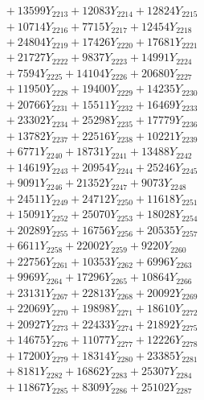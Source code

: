 \documentclass[a4paper,10pt]{article}
\begin{document}
{\begin{align}
&\;  + 13599 Y_{2213} + 12083 Y_{2214} + 12824 Y_{2215} \\[0.3ex]
&\;  + 10714 Y_{2216} + 7715 Y_{2217} + 12454 Y_{2218} \\[0.5ex]\allowbreak
&\;  + 24804 Y_{2219} + 17426 Y_{2220} + 17681 Y_{2221} \\[0.3ex]
&\;  + 21727 Y_{2222} + 9837 Y_{2223} + 14991 Y_{2224} \\[0.3ex]
&\;  + 7594 Y_{2225} + 14104 Y_{2226} + 20680 Y_{2227} \\[0.3ex]
&\;  + 11950 Y_{2228} + 19400 Y_{2229} + 14235 Y_{2230} \\[0.3ex]
&\;  + 20766 Y_{2231} + 15511 Y_{2232} + 16469 Y_{2233} \\[0.3ex]
&\;  + 23302 Y_{2234} + 25298 Y_{2235} + 17779 Y_{2236} \\[0.3ex]
&\;  + 13782 Y_{2237} + 22516 Y_{2238} + 10221 Y_{2239} \\[0.3ex]
&\;  + 6771 Y_{2240} + 18731 Y_{2241} + 13488 Y_{2242} \\[0.3ex]
&\;  + 14619 Y_{2243} + 20954 Y_{2244} + 25246 Y_{2245} \\[0.3ex]
&\;  + 9091 Y_{2246} + 21352 Y_{2247} + 9073 Y_{2248} \\[0.5ex]\allowbreak
&\;  + 24511 Y_{2249} + 24712 Y_{2250} + 11618 Y_{2251} \\[0.3ex]
&\;  + 15091 Y_{2252} + 25070 Y_{2253} + 18028 Y_{2254} \\[0.3ex]
&\;  + 20289 Y_{2255} + 16756 Y_{2256} + 20535 Y_{2257} \\[0.3ex]
&\;  + 6611 Y_{2258} + 22002 Y_{2259} + 9220 Y_{2260} \\[0.3ex]
&\;  + 22756 Y_{2261} + 10353 Y_{2262} + 6996 Y_{2263} \\[0.3ex]
&\;  + 9969 Y_{2264} + 17296 Y_{2265} + 10864 Y_{2266} \\[0.3ex]
&\;  + 23131 Y_{2267} + 22813 Y_{2268} + 20092 Y_{2269} \\[0.3ex]
&\;  + 22069 Y_{2270} + 19898 Y_{2271} + 18610 Y_{2272} \\[0.3ex]
&\;  + 20927 Y_{2273} + 22433 Y_{2274} + 21892 Y_{2275} \\[0.3ex]
&\;  + 14675 Y_{2276} + 11077 Y_{2277} + 12226 Y_{2278} \\[0.5ex]\allowbreak
&\;  + 17200 Y_{2279} + 18314 Y_{2280} + 23385 Y_{2281} \\[0.3ex]
&\;  + 8181 Y_{2282} + 16862 Y_{2283} + 25307 Y_{2284} \\[0.3ex]
&\;  + 11867 Y_{2285} + 8309 Y_{2286} + 25102 Y_{2287} \\[0.3ex]

\end{align}}
\end{document}
